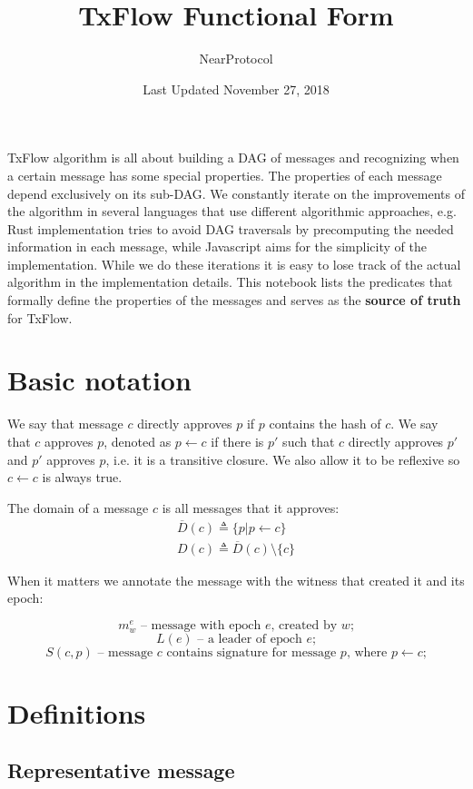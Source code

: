 \documentclass{article}
\title{TxFlow Functional Form}
\author{NearProtocol}
\date{Last Updated November 27, 2018}
\begin{document}
    \maketitle

    TxFlow algorithm is all about building a DAG of messages and recognizing when a certain message has some special properties. The properties of each message depend exclusively on its sub-DAG. We constantly iterate on the improvements of the algorithm in several languages that use different algorithmic approaches, e.g. Rust implementation tries to avoid DAG traversals by precomputing the needed information in each message, while Javascript aims for the simplicity of the implementation. While we do these iterations it is easy to lose track of the actual algorithm in the implementation details. This notebook lists the predicates that formally define the properties of the messages and serves as the \textbf{source of truth} for TxFlow.

    \section*{Basic notation}
    We say that message $c$ directly approves $p$ if $p$ contains the hash of $c$. We say that $c$ approves $p$, denoted as $p\leftarrow c$ if there is $p'$ such that $c$ directly approves $p'$ and $p'$ approves $p$, i.e. it is a transitive closure. We also allow it to be reflexive so $c\leftarrow c$ is always true.

    The domain of a message $c$ is all messages that it approves:
    \[
        \begin{aligned}
            \overline{D}(c) \triangleq \{p|p\leftarrow c\} \\
            D(c) \triangleq \overline{D}(c)\setminus\{c\}
        \end{aligned}
    \]

    When it matters we annotate the message with the witness that created it and its epoch:

    \[m_w^e \text{ -- message with epoch $e$, created by $w$;} \]
    \[L(e) \text{ -- a leader of epoch $e$;} \]
    \[S(c, p) \text{ -- message $c$ contains signature for message $p$, where $p\leftarrow c$;}\]

    \section*{Definitions}
    \subsection*{Representative message}
\end{document}

